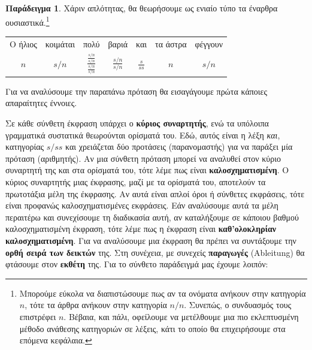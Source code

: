 \documentclass [a4paper,11pt] {book}
\theoremstyle{definition}
\newtheorem{example}[theorem]{Παράδειγμα}
\theoremstyle{definition}
\begin{document}
\begin{example}
\label{ex:Ajdukiewicz}
Χάριν απλότητας, θα θεωρήσουμε ως ενιαίο τύπο τα έναρθρα ουσιαστικά.\footnote{Μπορούμε εύκολα να διαπιστώσουμε πως αν τα ονόματα ανήκουν στην κατηγορία $n$, τότε τα άρθρα ανήκουν στην κατηγορία $n/n$. Συνεπώς, ο συνδυασμός τους επιστρέφει $n$. Βέβαια, και πάλι, οφείλουμε να μετέλθουμε μια πιο εκλεπτυσμένη μέθοδο ανάθεσης κατηγοριών σε λέξεις, κάτι το οποίο θα επιχειρήσουμε στα επόμενα κεφάλαια.}
\begin{center}
\begin{tabular}{ccccccc}
Ο ήλιος & κοιμάται & πολύ & βαριά & και & τα άστρα & φέγγουν \\ 
$n$ & $s/n$ & $\frac{\frac{s/n}{s/n}}{\frac{s/n}{s/n}}$ & $\frac{s/n}{s/n}$ & $\frac{s}{ss}$ & $n$ & $s/n$ \\ 
\end{tabular}
\end{center}
Για να αναλύσουμε την παραπάνω πρόταση θα εισαγάγουμε πρώτα κάποιες απαραίτητες έννοιες.
\end{example}
Σε κάθε σύνθετη έκφραση υπάρχει ο \textbf{κύριος συναρτητής}, ενώ τα υπόλοιπα γραμματικά συστατικά θεωρούνται ορίσματά του. Εδώ, αυτός είναι η λέξη \textit{και}, κατηγορίας $s/ss$ και χρειάζεται δύο προτάσεις (παρανομαστής) για να παράξει μία πρόταση (αριθμητής). Αν μια σύνθετη πρόταση μπορεί να αναλυθεί στον κύριο συναρτητή της και στα ορίσματά του, τότε λέμε πως είναι \textbf{καλοσχηματισμένη}. Ο κύριος συναρτητής μιας έκφρασης, μαζί με τα ορίσματά του, αποτελούν τα πρωτοτάξια μέλη της έκφρασης. Αν αυτά είναι απλοί όροι ή σύνθετες εκφράσεις, τότε είναι προφανώς καλοσχηματισμένες εκφράσεις. Εάν αναλύσουμε αυτά τα μέλη περαιτέρω και συνεχίσουμε τη διαδικασία αυτή, αν καταλήξουμε σε κάποιου βαθμού καλοσχηματισμένη έκφραση, τότε λέμε πως η έκφραση είναι \textbf{καθ'ολοκληρίαν καλοσχηματισμένη}. Για να αναλύσουμε μια έκφραση θα πρέπει να συντάξουμε την \textbf{ορθή σειρά των δεικτών} της. Στη συνέχεια, με συνεχείς \textbf{παραγωγές} (Ableitung) θα φτάσουμε στον \textbf{εκθέτη} της. Για το σύνθετο παράδειγμά μας έχουμε λοιπόν:
\end{document}
